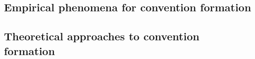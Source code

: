 

\subsection{Empirical phenomena for convention formation}

\subsection{Theoretical approaches to convention formation}

%
%
%
%
%
